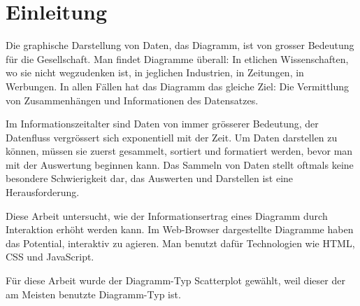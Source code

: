 \chapter{Einleitung}
Die graphische Darstellung von Daten, das Diagramm, ist von grosser Bedeutung für die Gesellschaft. Man findet Diagramme überall: In etlichen Wissenschaften, wo sie nicht wegzudenken ist, in jeglichen Industrien, in Zeitungen, in Werbungen. In allen Fällen hat das Diagramm das gleiche Ziel: Die Vermittlung von Zusammenhängen und Informationen des Datensatzes.

Im Informationszeitalter sind Daten von immer grösserer Bedeutung, der Datenfluss vergrössert sich exponentiell mit der Zeit. Um Daten darstellen zu können, müssen sie zuerst gesammelt, sortiert und formatiert werden, bevor man mit der Auswertung beginnen kann. Das Sammeln von Daten stellt oftmals keine besondere Schwierigkeit dar, das Auswerten und Darstellen ist eine Herausforderung.

Diese Arbeit untersucht, wie der Informationsertrag eines Diagramm durch Interaktion erhöht werden kann. Im Web-Browser dargestellte Diagramme haben das Potential, interaktiv zu agieren. Man benutzt dafür Technologien wie HTML, CSS und JavaScript.

Für diese Arbeit wurde der Diagramm-Typ Scatterplot gewählt, weil dieser der am Meisten \cite{maxAmAbend} benutzte Diagramm-Typ ist.